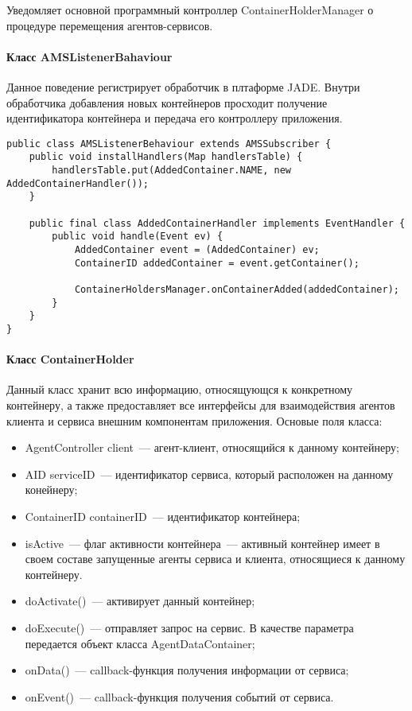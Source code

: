 Уведомляет основной программный контроллер ContainerHolderManager о процедуре перемещения агентов-сервисов.

\paragraph{Класс AMSListenerBahaviour}
Данное поведение регистрирует обработчик в плтаформе JADE. Внутри обработчика добавления новых контейнеров просходит получение идентификатора контейнера и передача его контроллеру приложения.
\begin{verbatim}
public class AMSListenerBehaviour extends AMSSubscriber {
    public void installHandlers(Map handlersTable) {
        handlersTable.put(AddedContainer.NAME, new AddedContainerHandler());
    }

    public final class AddedContainerHandler implements EventHandler {
        public void handle(Event ev) {
            AddedContainer event = (AddedContainer) ev;
            ContainerID addedContainer = event.getContainer();

            ContainerHoldersManager.onContainerAdded(addedContainer);
        }
    }
}
\end{verbatim}

\paragraph{Класс ContainerHolder}
Данный класс хранит всю информацию, относящующся к конкретному контейнеру, а также предоставляет все интерфейсы для взаимодействия агентов клиента и сервиса внешним компонентам приложения. Основые поля класса:

\begin{itemize}
\item AgentController client~--- агент-клиент, относящийся к данному контейнеру;
\item AID serviceID~--- идентификатор сервиса, который расположен на данному конейнеру;
\item ContainerID containerID~--- идентификатор контейнера;
\item isActive~--- флаг активности контейнера~--- активный контейнер имеет в своем составе запущенные агенты сервиса и клиента, относящиеся к данному контейнеру.
\end{itemize}

\begin{itemize}
\item doActivate()~--- активирует данный контейнер;
\item doExecute()~--- отправляет запрос на сервис. В качестве параметра передается объект класса AgentDataContainer;
\item onData()~--- callback-функция получения информации от сервиса;
\item onEvent()~--- callback-функция получения событий от сервиса.
\end{itemize}

